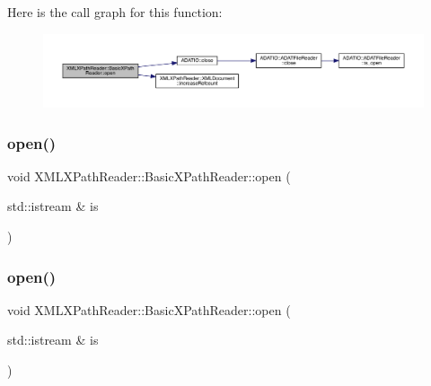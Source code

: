 Here is the call graph for this function\+:
\nopagebreak
\begin{figure}[H]
\begin{center}
\leavevmode
\includegraphics[width=350pt]{d6/dbf/classXMLXPathReader_1_1BasicXPathReader_ad8571b674b8deec118d9a53526631a06_cgraph}
\end{center}
\end{figure}
\mbox{\label{classXMLXPathReader_1_1BasicXPathReader_a48dbc690810bf8649486892c9385dbe6}} 
\subsubsection{\texorpdfstring{open()}{open()}\hspace{0.1cm}{\footnotesize\ttfamily [5/9]}}
{\footnotesize\ttfamily void X\+M\+L\+X\+Path\+Reader\+::\+Basic\+X\+Path\+Reader\+::open (\begin{DoxyParamCaption}\item[{std\+::istream \&}]{is }\end{DoxyParamCaption})}

\mbox{\label{classXMLXPathReader_1_1BasicXPathReader_a48dbc690810bf8649486892c9385dbe6}} 
\subsubsection{\texorpdfstring{open()}{open()}\hspace{0.1cm}{\footnotesize\ttfamily [6/9]}}
{\footnotesize\ttfamily void X\+M\+L\+X\+Path\+Reader\+::\+Basic\+X\+Path\+Reader\+::open (\begin{DoxyParamCaption}\item[{std\+::istream \&}]{is }\end{DoxyParamCaption})}

